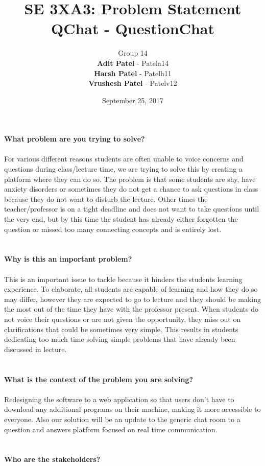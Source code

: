 \documentclass{article}
\title{SE 3XA3: Problem Statement \\ \textbf{QChat - QuestionChat}}
\author{Group 14
		\\\textbf{Adit Patel}     - Patela14
		\\\textbf{Harsh Patel}    - Patelh11
		\\\textbf{Vrushesh Patel} - Patelv12
}
\date{September 25, 2017}
\begin{document}
\maketitle
\newpage

\noindent\textbf{What problem are you trying to solve?}\\
\\For various different reasons students are often unable to voice concerns and questions
during class/lecture time, we are trying to solve this by creating a platform where they
can do so. The problem is that some students are shy, have anxiety disorders or
sometimes they do not get a chance to ask questions in class because they do not want
to disturb the lecture. Other times the teacher/professor is on a tight deadline and does
not want to take questions until the very end, but by this time the student has already
either forgotten the question or missed too many connecting concepts and is entirely
lost.
\\
\\
\\
\noindent\textbf{Why is this an important problem?}\\\\
This is an important issue to tackle because it hinders the students learning experience.
To elaborate, all students are capable of learning and how they do so may differ,
however they are expected to go to lecture and they should be making the most out of
the time they have with the professor present. When students do not voice their
questions or are not given the opportunity, they miss out on clarifications that could be
sometimes very simple. This results in students dedicating too much time solving simple
problems that have already been discussed in lecture.
\\
\\
\\
\noindent\textbf{What is the context of the problem you are solving?}\\\\
Redesigning the software to a web application so that users don’t have to download any
additional programs on their machine, making it more accessible to everyone. Also our
solution will be an update to the generic chat room to a question and answers platform
focused on real time communication.
\\
\\
\\
\noindent\textbf{Who are the stakeholders?}\\\\
\end{document}
